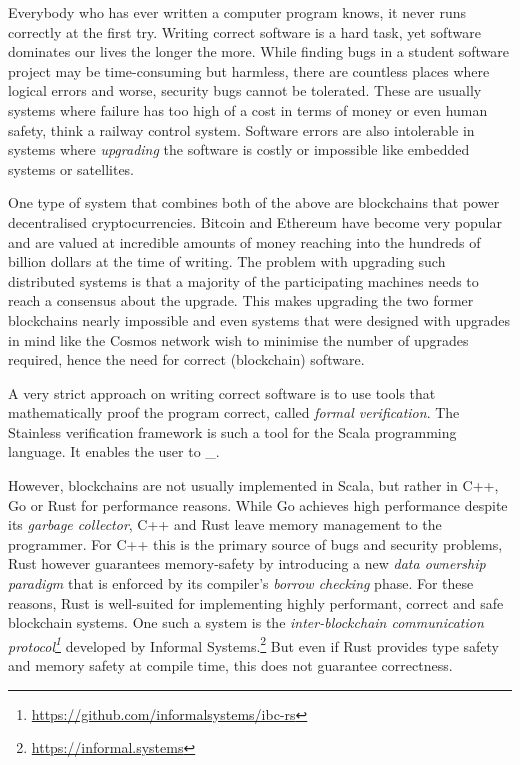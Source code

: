 Everybody who has ever written a computer program knows, it never runs
correctly at the first try. Writing correct software is a hard task, yet
software dominates our lives the longer the more. While finding bugs in
a student software project may be time-consuming but harmless, there are
countless places where logical errors and worse, security bugs cannot be
tolerated. These are usually systems where failure has too high of a
cost in terms of money or even human safety, think a railway control
system. Software errors are also intolerable in systems where
\emph{upgrading} the software is costly or impossible like embedded
systems or satellites.

One type of system that combines both of the above are blockchains that power
decentralised cryptocurrencies. Bitcoin \cite{bitcoin} and Ethereum
\cite{ethereum} have become very popular and are valued at incredible amounts of
money reaching into the hundreds of billion dollars at the time of writing. The
problem with upgrading such distributed systems is that a majority of the
participating machines needs to reach a consensus about the upgrade. This makes
upgrading the two former blockchains nearly impossible and even systems that
were designed with upgrades in mind like the Cosmos network \cite{cosmos} wish
to minimise the number of upgrades required, hence the need for correct
(blockchain) software.

A very strict approach on writing correct software is to use tools that
mathematically proof the program correct, called \emph{formal
verification}. The Stainless verification framework is such a tool for
the Scala programming language. It enables the user to \_.

However, blockchains are not usually implemented in Scala, but rather in C++, Go
or Rust for performance reasons. While Go achieves high performance despite its
\emph{garbage collector}, C++ and Rust leave memory management to the
programmer. For C++ this is the primary source of bugs and security problems,
Rust however guarantees memory-safety by introducing a new \emph{data ownership
paradigm} that is enforced by its compiler's \emph{borrow checking} phase. For
these reasons, Rust is well-suited for implementing highly performant, correct
and safe blockchain systems. One such a system is the \emph{inter-blockchain
communication
protocol\footnote{\url{https://github.com/informalsystems/ibc-rs}}} developed by
Informal Systems.\footnote{\url{https://informal.systems}} But even if Rust
provides type safety and memory safety at compile time, this does not guarantee
correctness.

